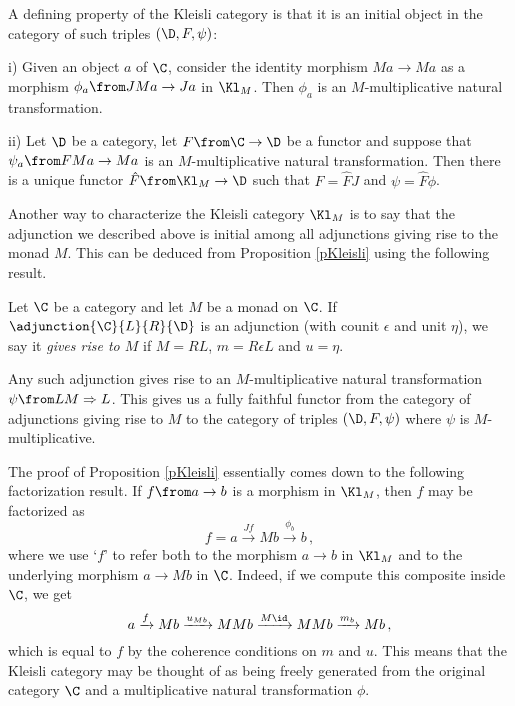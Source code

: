 A defining property of the Kleisli category is that it is an initial object in the category of such triples $(\D,F,\psi)$:

\begin{proposition}
  i) Given an object $a$ of $\C$, consider the identity morphism $Ma \to Ma$ as a morphism $\phi_a \from JMa \to Ja$ in $\Kl_M$.  
  Then $\phi_a$ is an $M$-multiplicative natural transformation.

  ii) Let $\D$ be a category, let $F\from \C \to \D$ be a functor and suppose that $\psi_a\from FMa \to Ma$ is an $M$-multiplicative natural transformation.
  Then there is a unique functor $\hat{F}\from \Kl_M \to \D$ such that $F=\hat{F}J$ and $\psi = \hat{F}\phi$.
  \label{pKleisli}
\end{proposition}

Another way to characterize the Kleisli category $\Kl_M$ is to say that the adjunction we described above is initial among all adjunctions giving rise to the monad $M$.  
This can be deduced from Proposition \ref{pKleisli} using the following result.

\begin{lemma}
  Let $\C$ be a category and let $M$ be a monad on $\C$.  
  If $\adjunction{\C}{L}{R}{\D}$ is an adjunction (with counit $\epsilon$ and unit $\eta$), we say it \emph{gives rise to $M$} if $M=RL$, $m=R\epsilon L$ and $u=\eta$.

  Any such adjunction gives rise to an $M$-multiplicative natural transformation $\psi\from LM \Rightarrow L$.  
  This gives us a fully faithful functor from the category of adjunctions giving rise to $M$ to the category of triples $(\D,F,\psi)$ where $\psi$ is $M$-multiplicative.
\end{lemma}

The proof of Proposition \ref{pKleisli} essentially comes down to the following factorization result.  
If $f\from a \to b$ is a morphism in $\Kl_M$, then $f$ may be factorized as
\[
  f = a \xrightarrow{Jf}
  Mb \xrightarrow{\phi_b}
  b\,,
  \]
where we use `$f$' to refer both to the morphism $a\to b$ in $\Kl_M$ and to the underlying morphism $a \to Mb$ in $\C$.
Indeed, if we compute this composite inside $\C$, we get
\[
  a \xrightarrow{f}
  Mb \xrightarrow{u_{Mb}}
  MMb \xrightarrow{M\id}
  MMb \xrightarrow{m_b}
  Mb\,,
  \]
which is equal to $f$ by the coherence conditions on $m$ and $u$.
This means that the Kleisli category may be thought of as being freely generated from the original category $\C$ and a multiplicative natural transformation $\phi$.

